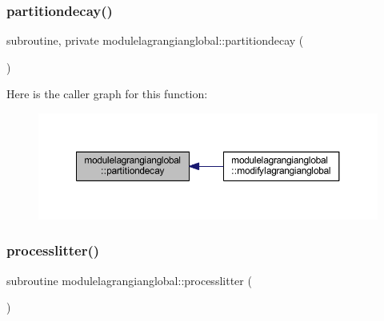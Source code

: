 \subsubsection{\texorpdfstring{partitiondecay()}{partitiondecay()}}
{\footnotesize\ttfamily subroutine, private modulelagrangianglobal\+::partitiondecay (\begin{DoxyParamCaption}{ }\end{DoxyParamCaption})\hspace{0.3cm}{\ttfamily [private]}}

Here is the caller graph for this function\+:\nopagebreak
\begin{figure}[H]
\begin{center}
\leavevmode
\includegraphics[width=350pt]{namespacemodulelagrangianglobal_acb7dabdfc279e06f8231d68f34a4bd76_icgraph}
\end{center}
\end{figure}
\mbox{\label{namespacemodulelagrangianglobal_ae943a682fa588e08202185a107d59f97}} 
\subsubsection{\texorpdfstring{processlitter()}{processlitter()}}
{\footnotesize\ttfamily subroutine modulelagrangianglobal\+::processlitter (\begin{DoxyParamCaption}{ }\end{DoxyParamCaption})\hspace{0.3cm}{\ttfamily [private]}}

